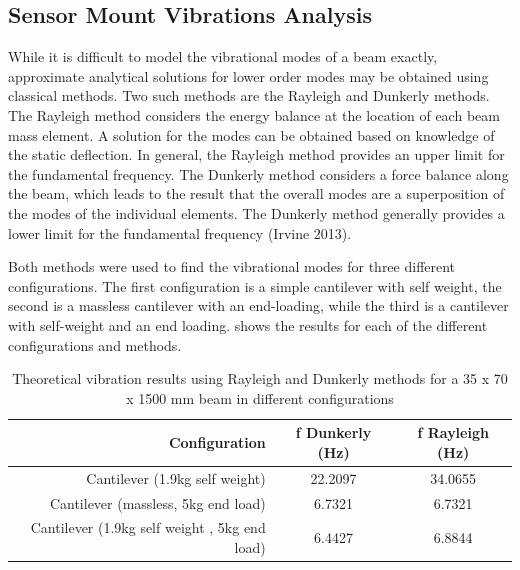 \documentclass[main.tex]{subfiles}
\begin{document}
\begin{appendices}
\chapter{Sensor Mount Vibrations Analysis}
While it is difficult to model the vibrational modes of a beam exactly, approximate analytical solutions for lower order modes may be obtained using classical methods. Two such methods are the Rayleigh and Dunkerly methods. The Rayleigh method considers the energy balance at the location of each beam mass element. A solution for the modes can be obtained based on knowledge of the static deflection. In general, the Rayleigh method provides an upper limit for the fundamental frequency. The Dunkerly method considers a force balance along the beam, which leads to the result that the overall modes are a superposition of the modes of the individual elements. The Dunkerly method generally provides a lower limit for the fundamental frequency (Irvine 2013).

Both methods were used to find the vibrational modes for three different configurations. The first configuration is a simple cantilever with self weight, the second is a massless cantilever with an end-loading, while the third is a cantilever with self-weight and an end loading.   shows the results for each of the different configurations and methods.



\begin{table} [ht]
\centering
\caption[Theoretical vibration results using Rayleigh and Dunkerly methods]{Theoretical vibration results using Rayleigh and Dunkerly methods for a 35 x 70 x 1500 mm beam in different configurations }
\begin{tabular} {r c c}
\toprule
Configuration & f Dunkerly (Hz) & f Rayleigh (Hz)  \\ \midrule
Cantilever (1.9kg self weight) & 22.2097 & 34.0655  \\
Cantilever (massless, 5kg end load) & 6.7321 & 6.7321 \\
Cantilever (1.9kg self weight , 5kg end load) & 6.4427 & 6.8844 \\ \bottomrule
\end{tabular}
\end{table}


\end{appendices}
\end{document}
